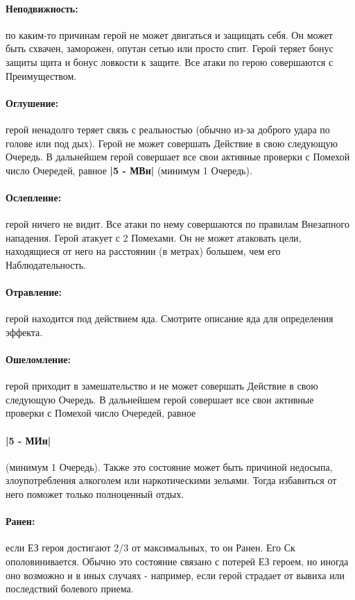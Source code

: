 \paragraph{Неподвижность:} по каким-то причинам герой не может двигаться и защищать себя. Он может быть схвачен, заморожен, опутан сетью или просто спит. Герой теряет бонус защиты щита и бонус ловкости к защите. Все атаки по герою совершаются с Преимуществом.
\paragraph{Оглушение:} герой ненадолго теряет связь с реальностью (обычно из-за доброго удара по голове или под дых). Герой не может совершать Действие в свою следующую Очередь. В дальнейшем герой совершает все свои активные проверки с Помехой число Очередей, равное \textbf{|5 - МВн|} (минимум 1 Очередь).
\paragraph{Ослепление:} герой ничего не видит. Все атаки по нему совершаются по правилам Внезапного нападения. Герой атакует с 2 Помехами. Он не может атаковать цели, находящиеся от него на расстоянии (в метрах) большем, чем его Наблюдательность.
\paragraph{Отравление:} герой находится под действием яда. Смотрите описание яда для определения эффекта.
\paragraph{Ошеломление:} герой приходит в замешательство и не может совершать Действие в свою следующую Очередь. В дальнейшем герой совершает все свои активные проверки с Помехой число Очередей, равное \paragraph{|5 - МИн|} (минимум 1 Очередь). Также это состояние может быть причиной недосыпа, злоупотребления алкоголем или наркотическими зельями. Тогда избавиться от него поможет только полноценный отдых.
\paragraph{Ранен:} если ЕЗ героя достигают 2/3 от максимальных, то он Ранен. Его Ск ополовинивается. Обычно это состояние связано с потерей ЕЗ героем, но иногда оно возможно и в иных случаях - например, если герой страдает от вывиха или последствий болевого приема.
